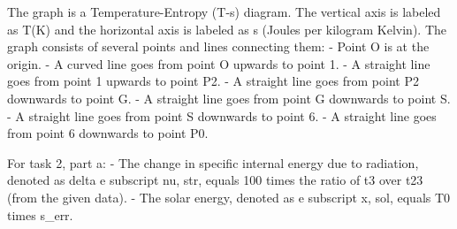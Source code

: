 The graph is a Temperature-Entropy (T-s) diagram. The vertical axis is labeled as T(K) and the horizontal axis is labeled as s (Joules per kilogram Kelvin). The graph consists of several points and lines connecting them:
- Point O is at the origin.
- A curved line goes from point O upwards to point 1.
- A straight line goes from point 1 upwards to point P2.
- A straight line goes from point P2 downwards to point G.
- A straight line goes from point G downwards to point S.
- A straight line goes from point S downwards to point 6.
- A straight line goes from point 6 downwards to point P0.

For task 2, part a:
- The change in specific internal energy due to radiation, denoted as delta e subscript nu, str, equals 100 times the ratio of t3 over t23 (from the given data).
- The solar energy, denoted as e subscript x, sol, equals T0 times s_err.